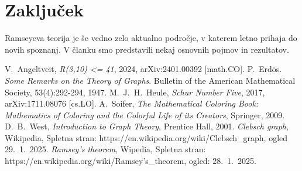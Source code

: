 \documentclass[twoside,11pt]{article}
\begin{document}

\section{Zaključek}
Ramseyeva teorija je še vedno zelo aktualno področje, v 
katerem letno prihaja do novih spoznanj. 
V članku smo predstavili nekaj osnovnih pojmov in rezultatov.

\begin{thebibliography}{99}
     V.~Angeltveit, \emph{R(3,10) <= 41}, 2024, arXiv:2401.00392 [math.CO].
     P.~Erdös. \emph{Some Remarks on the Theory of Graphs}. Bulletin of the
    American Mathematical Society, 53(4):292-294, 1947.
     M.~J.~H.~Heule, \emph{Schur Number Five}, 2017, arXiv:1711.08076 [cs.LO].
     A.~Soifer, \emph{The Mathematical Coloring Book: Mathematics of Coloring and the Colorful Life of its Creators},
    Springer, 2009.
     D.~B.~West, \emph{Introduction to Graph Theory}, Prentice Hall, 2001.
     \emph{Clebsch graph}, Wikipedia, Spletna stran: https://en.wikipedia.org/wiki/Clebsch\_graph, ogled 29.~1.~2025.
     \emph{Ramsey's theorem}, Wipedia, Spletna stran: https://en.wikipedia.org/wiki/Ramsey's\_theorem, ogled: 28.~1.~2025.
\end{thebibliography}
\end{document}
